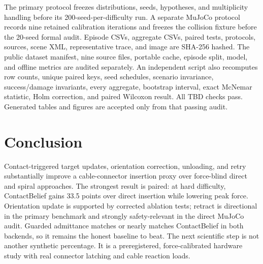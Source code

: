 \documentclass[journal]{IEEEtran}
\newcommand{\AuditChecks}{TBD}
\begin{document}
The primary protocol freezes distributions, seeds, hypotheses, and multiplicity
handling before its 200-seed-per-difficulty run.  A separate MuJoCo protocol
records nine retained calibration iterations and freezes the collision fixture
before the 20-seed formal audit.  Episode CSVs, aggregate CSVs, paired tests,
protocols, sources, scene XML, representative trace, and image are SHA-256
hashed.  The public dataset manifest, nine source files, portable cache, episode
split, model, and offline metrics are audited separately.  An independent script
also recomputes row counts, unique paired keys, seed schedules, scenario
invariance, success/damage invariants, every aggregate, bootstrap interval,
exact McNemar statistic, Holm correction, and paired Wilcoxon result.  All
\AuditChecks{} checks pass.  Generated tables and figures are accepted only from
that passing audit.

\section{Conclusion}

Contact-triggered target updates, orientation correction, unloading, and retry
substantially improve a cable-connector insertion proxy over force-blind direct
and spiral approaches.  The strongest result is paired: at hard difficulty,
ContactBelief gains 33.5 points over direct insertion while lowering peak force.
Orientation update is supported by corrected ablation tests; retract is
directional in the primary benchmark and strongly safety-relevant in the direct
MuJoCo audit.  Guarded admittance matches or nearly matches ContactBelief in both
backends, so it remains the honest baseline to beat.  The next scientific step
is not another synthetic percentage.  It is a preregistered, force-calibrated
hardware study with real connector latching and cable reaction loads.



\end{document}
